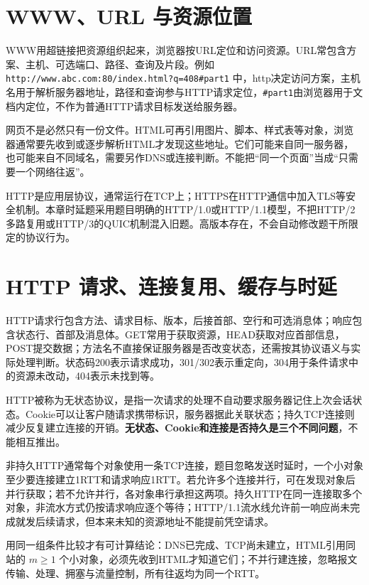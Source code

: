 \section{WWW、URL 与资源位置}\label{cn-06-07}

WWW用超链接把资源组织起来，浏览器按URL定位和访问资源。URL常包含方案、主机、可选端口、路径、查询及片段。例如 \texttt{http://www.abc.com:80/index.html?q=408\#part1} 中，http决定访问方案，主机名用于解析服务器地址，路径和查询参与HTTP请求定位，\texttt{\#part1}由浏览器用于文档内定位，不作为普通HTTP请求目标发送给服务器。

网页不是必然只有一份文件。HTML可再引用图片、脚本、样式表等对象，浏览器通常要先收到或逐步解析HTML才发现这些地址。它们可能来自同一服务器，也可能来自不同域名，需要另作DNS或连接判断。不能把``同一个页面''当成``只需要一个网络往返''。

HTTP是应用层协议，通常运行在TCP上；HTTPS在HTTP通信中加入TLS等安全机制。本章时延题采用题目明确的HTTP/1.0或HTTP/1.1模型，不把HTTP/2多路复用或HTTP/3的QUIC机制混入旧题。高版本存在，不会自动修改题干所限定的协议行为。

\section{HTTP 请求、连接复用、缓存与时延}\label{cn-06-08}

HTTP请求行包含方法、请求目标、版本，后接首部、空行和可选消息体；响应包含状态行、首部及消息体。GET常用于获取资源，HEAD获取对应首部信息，POST提交数据；方法名不直接保证服务器是否改变状态，还需按其协议语义与实际处理判断。状态码200表示请求成功，301/302表示重定向，304用于条件请求中的资源未改动，404表示未找到等。

HTTP被称为无状态协议，是指一次请求的处理不自动要求服务器记住上次会话状态。Cookie可以让客户随请求携带标识，服务器据此关联状态；持久TCP连接则减少反复建立连接的开销。\textbf{无状态、Cookie和连接是否持久是三个不同问题}，不能相互推出。

非持久HTTP通常每个对象使用一条TCP连接，题目忽略发送时延时，一个小对象至少要连接建立1RTT和请求响应1RTT。若允许多个连接并行，可在发现对象后并行获取；若不允许并行，各对象串行承担这两项。持久HTTP在同一连接取多个对象，非流水方式仍按请求响应逐个等待；HTTP/1.1流水线允许前一响应尚未完成就发后续请求，但本来未知的资源地址不能提前凭空请求。

用同一组条件比较才有可计算结论：DNS已完成、TCP尚未建立，HTML引用同站的 \(m\ge1\) 个小对象，必须先收到HTML才知道它们；不并行建连接，忽略报文传输、处理、拥塞与流量控制，所有往返均为同一个RTT。

